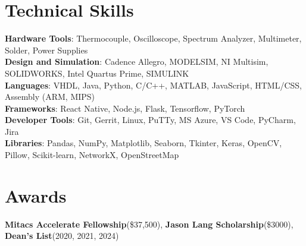 \documentclass[A4,10pt]{article}
\newcommand{\resumeItem}[1]{
  \item\small{
    {#1 \vspace{-2pt}}
  }
}
\newcommand{\resumeItemListStart}{\begin{itemize}}
\newcommand{\resumeItemListEnd}{\end{itemize}\vspace{-5pt}}
\begin{document}
\section{Technical Skills}
 \begin{itemize}[leftmargin=0.15in, label={}]
    \small{\item{
     \textbf{Hardware Tools}{: Thermocouple, Oscilloscope, Spectrum Analyzer, Multimeter, Solder, Power Supplies}\\
     \textbf{Design and Simulation}{: Cadence Allegro, MODELSIM, NI Multisim, SOLIDWORKS, Intel Quartus Prime, SIMULINK}\\
     \textbf{Languages}{: VHDL, Java, Python, C/C++, MATLAB, JavaScript, HTML/CSS, Assembly (ARM, MIPS)} \\
     \textbf{Frameworks}{: React Native, Node.js, Flask, Tensorflow, PyTorch} \\
     \textbf{Developer Tools}{: Git, Gerrit, Linux, PuTTy, MS Azure, VS Code, PyCharm, Jira} \\
     \textbf{Libraries}{: Pandas, NumPy, Matplotlib, Seaborn, Tkinter, Keras, OpenCV, Pillow, Scikit-learn, NetworkX, OpenStreetMap}\\
    }}
 \end{itemize}

\section{Awards}
 \begin{itemize}[leftmargin=0.15in, label={}]
  \small{\item{
    \textbf{Mitacs Accelerate Fellowship}{(\$37,500),} \textbf{Jason Lang Scholarship}{(\$3000),} \textbf{Dean's List}{(2020, 2021, 2024)} %
  }}
\end{itemize}
\end{document}
